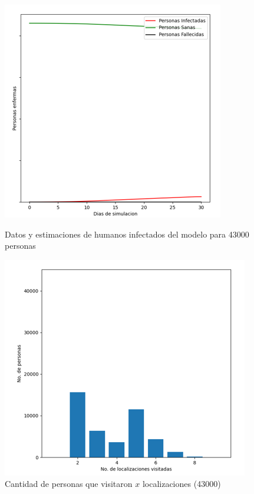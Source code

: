 \begin{figure}[htbp]
    \centering
    \begin{minipage}[t]{0.5\textwidth}
    \centering
    \includegraphics[width=\textwidth]{Graphics/I_M_S_43000.png}
    \caption{Datos y estimaciones de humanos infectados del modelo para 43000 personas}
    \end{minipage}\hfill
    \begin{minipage}[t]{0.5\textwidth}
    \centering
    \includegraphics[width=\textwidth]{Graphics/Loc_Pers_43000.png}
    \caption{Cantidad de personas que visitaron $x$ localizaciones (43000)}
    \end{minipage}
\end{figure}
